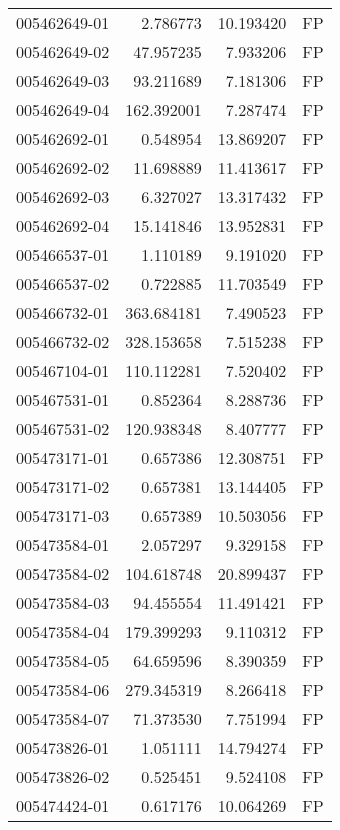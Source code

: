 \begin{tabular}{lrrl}
005462649-01 &    2.786773 &      10.193420 &   FP \\
005462649-02 &   47.957235 &       7.933206 &   FP \\
005462649-03 &   93.211689 &       7.181306 &   FP \\
005462649-04 &  162.392001 &       7.287474 &   FP \\
005462692-01 &    0.548954 &      13.869207 &   FP \\
005462692-02 &   11.698889 &      11.413617 &   FP \\
005462692-03 &    6.327027 &      13.317432 &   FP \\
005462692-04 &   15.141846 &      13.952831 &   FP \\
005466537-01 &    1.110189 &       9.191020 &   FP \\
005466537-02 &    0.722885 &      11.703549 &   FP \\
005466732-01 &  363.684181 &       7.490523 &   FP \\
005466732-02 &  328.153658 &       7.515238 &   FP \\
005467104-01 &  110.112281 &       7.520402 &   FP \\
005467531-01 &    0.852364 &       8.288736 &   FP \\
005467531-02 &  120.938348 &       8.407777 &   FP \\
005473171-01 &    0.657386 &      12.308751 &   FP \\
005473171-02 &    0.657381 &      13.144405 &   FP \\
005473171-03 &    0.657389 &      10.503056 &   FP \\
005473584-01 &    2.057297 &       9.329158 &   FP \\
005473584-02 &  104.618748 &      20.899437 &   FP \\
005473584-03 &   94.455554 &      11.491421 &   FP \\
005473584-04 &  179.399293 &       9.110312 &   FP \\
005473584-05 &   64.659596 &       8.390359 &   FP \\
005473584-06 &  279.345319 &       8.266418 &   FP \\
005473584-07 &   71.373530 &       7.751994 &   FP \\
005473826-01 &    1.051111 &      14.794274 &   FP \\
005473826-02 &    0.525451 &       9.524108 &   FP \\
005474424-01 &    0.617176 &      10.064269 &   FP \\

\end{tabular}
